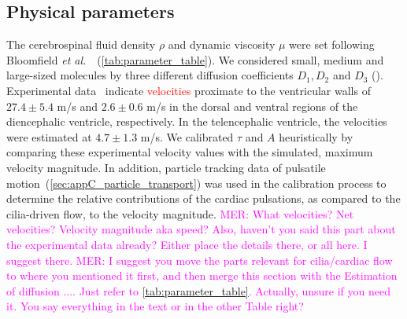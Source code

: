 \documentclass[fleqn]{wlscirep}
\newcommand{\mer}[1]{\textcolor{magenta}{#1}}
\newcommand{\fixme}[1]{\textcolor{red}{#1}}
\begin{document}
\subsection*{Physical parameters}
The cerebrospinal fluid density $\rho$ and dynamic viscosity $\mu$ were set following Bloomfield \textit{et al.}~\cite{Bloomfield1998EffectsFluid}~(\cref{tab:parameter_table}). We considered small, medium and large-sized molecules by three different diffusion coefficients $D_1, D_2$ and $D_3$ (). Experimental data~\cite{Olstad2019CiliaryDevelopment} indicate \fixme{velocities} proximate to the ventricular walls of $27.4 \pm 5.4$ \textmu m/s and $2.6 \pm 0.6$ \textmu m/s in the dorsal and ventral regions of the diencephalic ventricle, respectively. In the telencephalic ventricle, the velocities were estimated at $4.7 \pm 1.3$ \textmu m/s. We calibrated $\tau$ and $A$ heuristically by comparing these experimental velocity values with the simulated, maximum velocity magnitude. In addition, particle tracking data of pulsatile motion~(\cref{sec:appC_particle_transport}) was used in the calibration process to determine the relative contributions of the cardiac pulsations, as compared to the cilia-driven flow, to the velocity magnitude.
\mer{MER: What velocities? Net velocities? Velocity magnitude aka speed? Also, haven't you said this part about the experimental data already? Either place the details there, or all here. I suggest there.}
\mer{MER: I suggest you move the parts relevant for cilia/cardiac flow to where you mentioned it first, and then merge this section with the Estimation of diffusion .... Just refer to \cref{tab:parameter_table}. Actually, unsure if you need it. You say everything in the text or in the other Table right?}
\end{document}
